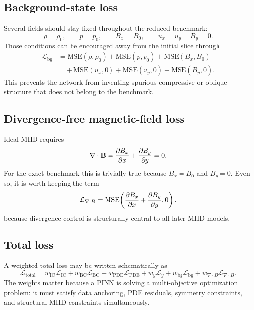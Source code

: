 \documentclass[11pt]{article}
\newcommand{\Bvec}{\mathbf{B}}
\begin{document}
\subsection{Background-state loss}
Several fields should stay fixed throughout the reduced benchmark:
\begin{equation}
\rho=\rho_0,\qquad
p=p_0,\qquad
B_x=B_0,\qquad
u_x=u_y=B_y=0.
\end{equation}
Those conditions can be encouraged away from the initial slice through
\begin{align}
\mathcal{L}_{\mathrm{bg}}
&=
\mathrm{MSE}(\rho,\rho_0)
+
\mathrm{MSE}(p,p_0)
+
\mathrm{MSE}(B_x,B_0)
\nonumber\\
&\quad
+
\mathrm{MSE}(u_x,0)
+
\mathrm{MSE}(u_y,0)
+
\mathrm{MSE}(B_y,0).
\label{eq:m3-lbg}
\end{align}
This prevents the network from inventing spurious compressive or oblique structure that does not belong to the benchmark.

\subsection{Divergence-free magnetic-field loss}
Ideal MHD requires
\begin{equation}
\nabla\cdot\Bvec
=
\pdv{B_x}{x}+\pdv{B_y}{y}=0.
\label{eq:m3-divb}
\end{equation}
For the exact benchmark this is trivially true because $B_x=B_0$ and $B_y=0$. Even so, it is worth keeping the term
\begin{equation}
\mathcal{L}_{\nabla\cdot B}
=
\mathrm{MSE}\!\left(
\pdv{B_x}{x}+\pdv{B_y}{y},
0
\right),
\label{eq:m3-ldivb}
\end{equation}
because divergence control is structurally central to all later MHD models.

\subsection{Total loss}
A weighted total loss may be written schematically as
\begin{equation}
\mathcal{L}_{\mathrm{total}}
=
w_{\mathrm{IC}}\mathcal{L}_{\mathrm{IC}}
+
w_{\mathrm{BC}}\mathcal{L}_{\mathrm{BC}}
+
w_{\mathrm{PDE}}\mathcal{L}_{\mathrm{PDE}}
+
w_y \mathcal{L}_y
+
w_{\mathrm{bg}}\mathcal{L}_{\mathrm{bg}}
+
w_{\nabla\cdot B}\mathcal{L}_{\nabla\cdot B}.
\label{eq:m3-ltotal}
\end{equation}
The weights matter because a PINN is solving a multi-objective optimization problem: it must satisfy data anchoring, PDE residuals, symmetry constraints, and structural MHD constraints simultaneously.
\end{document}
